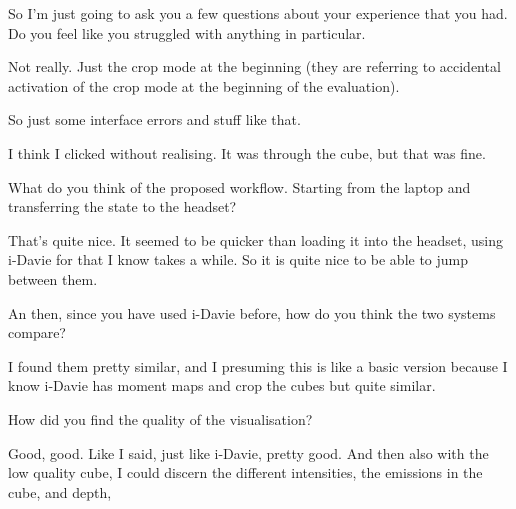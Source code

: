 \begin{description}

    \mich So I'm just going to ask you a few questions about your experience that you had. Do you feel like you struggled with anything in particular.
    
    \kyra Not really. Just the crop mode at the beginning (they are referring to accidental activation of the crop mode at the beginning of the evaluation).
    
    \mich So just some interface errors and stuff like that.
    
    \kyra I think I clicked without realising. It was through the cube, but that was fine.
    
    \mich What do you think of the proposed workflow. Starting from the laptop and transferring the state to the headset?
    
    \kyra That's quite nice. It seemed to be quicker than loading it into the headset, using i-Davie for that I know takes a while. So it is quite nice to be able to jump between them.
    
    \mich An then, since you have used i-Davie before, how do you think the two systems compare?
    
    \kyra I found them pretty similar, and I presuming this is like a basic version because I know i-Davie has moment maps and crop the cubes but quite similar.
    
    \mich How did you find the quality of the visualisation?
    
    \kyra Good, good. Like I said, just like i-Davie, pretty good. And then also with the low quality cube, I could discern the different intensities, the emissions in the cube, and depth, 

\end{description}
